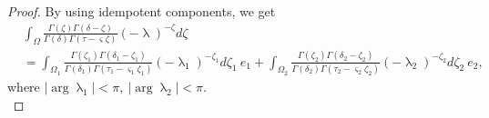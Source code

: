 \documentclass[a4paper,12pt]{article}
\newtheorem{theorem}{Theorem}[section]
\theoremstyle{remark}
\begin{document}
\begin{proof} By using idempotent components, we get 
	\begin{equation}\label{eq:intrep1}
	\begin{split}
&\int_{\Omega}	\frac{\Gamma(\zeta)\Gamma(\delta-\zeta)}{\Gamma(\delta)\Gamma(\tau- \varsigma \zeta)}(-\uplambda )^{-\zeta}d\zeta\\
&=\int_{\Omega_1}	\frac{\Gamma(\zeta_1)\Gamma(\delta_1-\zeta_1)}{\Gamma(\delta_1)\Gamma(\tau_1- \varsigma_1 \zeta_1)}(-\uplambda_1 )^{-\zeta_1}d\zeta_1~e_1+\int_{\Omega_2}	\frac{\Gamma(\zeta_2)\Gamma(\delta_2-\zeta_2)}{\Gamma(\delta_2)\Gamma(\tau_2- \varsigma_2 \zeta_2)}(-\uplambda_2 )^{-\zeta_2}d\zeta_2~ e_2,
	\end{split}        
	\end{equation}
    where $|\arg \uplambda_1|<\pi,~|\arg \uplambda_2 |<\pi.$ \\ 
    

\end{proof}
\end{document}
